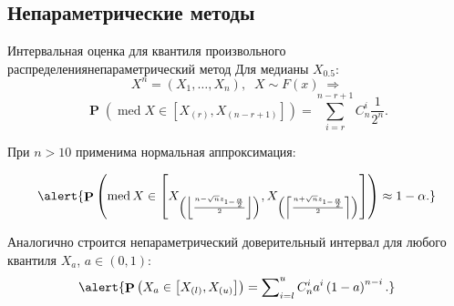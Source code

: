 \documentclass[11pt,pdf,utf8,hyperref={unicode},aspectratio=169]{beamer}
\DeclareMathOperator{\prob}{\mathbf{P}}
\DeclareMathOperator{\med}{med}
\begin{document}
\subsection{Непараметрические методы}

\begin{frame}{Интервальная оценка для квантиля произвольного распределения}{непараметрический метод}
	Для медианы $X_{0.5}$:
	$$
    X^n = \left(X_1,\dots, X_n\right), \;\; X\sim    F\left(x\right)\; \Longrightarrow
    $$
	   $$\prob\left(\med X \in \left[X_{(r)}, X_{(n-r+1)}\right]\right) =  \sum\limits_{i=r}^{n-r+1} C_n^i\frac{1}{2^n}.
    $$

	При $n>10$ применима нормальная аппроксимация:

	$$
    \alert{\prob\left(\med X \in \left[X_{\left(\left\lfloor \frac{n - \sqrt{n} z_{1-\frac{\alpha}{2}}}{2} \right\rfloor\right)}, X_{\left(\left\lceil  \frac{n + \sqrt{n} z_{1-\frac{\alpha}{2}}}{2} \right\rceil \right)}\right]\right) \approx 1-\alpha.}
    $$

	\bigskip

	Аналогично строится непараметрический доверительный интервал для любого квантиля $X_a$, $a\in\left(0,1\right)$:
	$$
    \alert{\prob\left(X_a \in \left[X_{(l)}, X_{(u)}\right]\right) = \sum\nolimits_{i=l}^u C_n^i a^i \left(1-a\right)^{n-i}.}
    $$
\end{frame}
\end{document}
